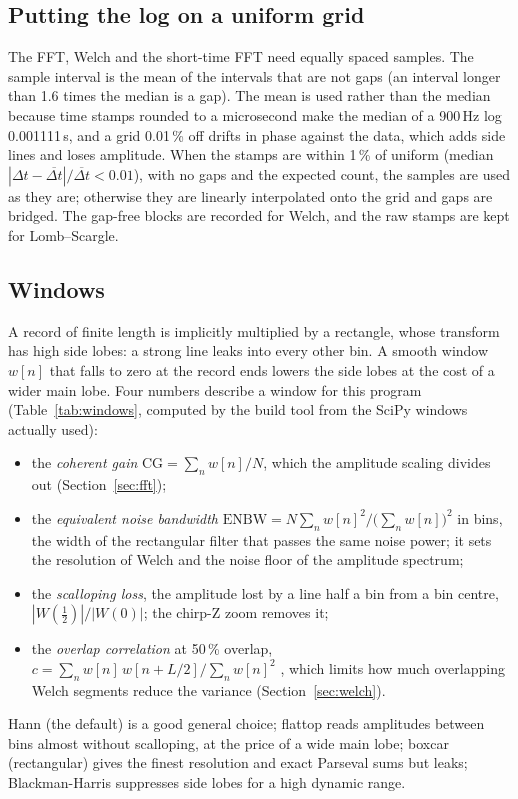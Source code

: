 \documentclass[10pt,letterpaper]{article}
\numberwithin{equation}{section}
\begin{document}
\subsection{Putting the log on a uniform grid}\label{sec:grid}
The FFT, Welch and the short-time FFT need equally spaced samples. The sample
interval is the mean of the intervals that are not gaps (an interval longer
than 1.6 times the median is a gap). The mean is used rather than the median
because time stamps rounded to a microsecond make the median of a 900\,Hz log
0.001111\,s, and a grid 0.01\,\% off drifts in phase against the data, which
adds side lines and loses amplitude. When the stamps are within 1\,\% of uniform
(median $|\Delta t - \overline{\Delta t}|/\overline{\Delta t} < 0.01$), with no
gaps and the expected count, the samples are used as they are; otherwise they
are linearly interpolated onto the grid and gaps are bridged. The gap-free
blocks are recorded for Welch, and the raw stamps are kept for Lomb--Scargle.

\subsection{Windows}\label{sec:windows}
A record of finite length is implicitly multiplied by a rectangle, whose
transform has high side lobes: a strong line leaks into every other bin. A
smooth window $w[n]$ that falls to zero at the record ends lowers the side
lobes at the cost of a wider main lobe. Four numbers describe a window for this
program (Table~\ref{tab:windows}, computed by the build tool from the SciPy
windows actually used):
\begin{itemize}
\item the \emph{coherent gain} $\mathrm{CG} = \sum_n w[n]/N$, which the
amplitude scaling divides out (Section~\ref{sec:fft});
\item the \emph{equivalent noise bandwidth}
$\mathrm{ENBW} = N\sum_n w[n]^2 / \big(\sum_n w[n]\big)^2$ in bins, the width of
the rectangular filter that passes the same noise power; it sets the
resolution of Welch and the noise floor of the amplitude spectrum;
\item the \emph{scalloping loss}, the amplitude lost by a line half a bin from a
bin centre, $|W(\tfrac12)|/|W(0)|$; the chirp-Z zoom removes it;
\item the \emph{overlap correlation} at 50\,\% overlap,
$c = \sum_n w[n]\,w[n+L/2] / \sum_n w[n]^2$ \cite{R16}, which limits how
much overlapping Welch segments reduce the variance (Section~\ref{sec:welch}).
\end{itemize}
Hann (the default) is a good general choice; flattop reads amplitudes between
bins almost without scalloping, at the price of a wide main lobe; boxcar
(rectangular) gives the finest resolution and exact Parseval sums but leaks;
Blackman-Harris suppresses side lobes for a high dynamic range.
\end{document}
